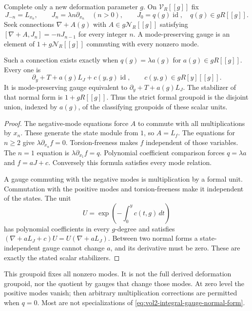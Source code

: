 Complete only a new deformation parameter $g$. On
$\mathcal V_R[[g]]$ fix
\[
 J_{-n}=L_{x_n},\qquad J_n=\lambda n\partial_{x_n}\quad(n>0),
 \qquad J_0=q(g)\operatorname{id},\quad q(g)\in gR[[g]].
\]
Seek connections $\nabla+A(g)$ with
$A\in g\mathcal N_R[[g]]$ satisfying
$[\nabla+A,J_n]=-nJ_{n-1}$ for every integer $n$.
A mode-preserving gauge is an element of
$1+g\mathcal N_R[[g]]$ commuting with every nonzero mode.

\begin{theorem}\label{thm:vol2-integral-gauge}
Such a connection exists exactly when $q(g)=\lambda a(g)$
for $a(g)\in gR[[g]]$. Every one is
\begin{equation}\label{eq:vol2-integral-gauge-normal-form}
 \partial_y+T+a(g)L_J+c(y,g)\operatorname{id},
                 \qquad c(y,g)\in gR[y][[g]].
\end{equation}
It is mode-preserving gauge equivalent to $\partial_y+T+a(g)L_J$.
The stabilizer of that normal form is $1+gR[[g]]$.
Thus the strict formal groupoid is the disjoint union, indexed
by $a(g)$, of the classifying groupoids of these scalar units.
\end{theorem}
\begin{proof}
The negative-mode equations force $A$ to commute with all
multiplications by $x_n$. These generate the state module
from $1$, so $A=L_f$. The equations for $n\geq2$ give
$\lambda\partial_{x_n}f=0$. Torsion-freeness makes $f$
independent of those variables. The $n=1$ equation is
$\lambda\partial_{x_1}f=q$. Polynomial coefficient comparison
forces $q=\lambda a$ and $f=aJ+c$. Conversely this formula
satisfies every mode relation.

A gauge commuting with the negative modes is multiplication
by a formal unit. Commutation with the positive modes and
torsion-freeness make it independent of the states. The unit
\[
 U=\exp\left(-\int_0^yc(t,g)\,dt\right)
\]
has polynomial coefficients in every $g$-degree and satisfies
$(\nabla+aL_J+c)U=U(\nabla+aL_J)$.
Between two normal forms a state-independent gauge cannot
change $a$, and its derivative must be zero. These are exactly
the stated scalar stabilizers.
\end{proof}

This groupoid fixes all nonzero modes. It is not the full
derived deformation groupoid, nor the quotient by gauges that
change those modes. At zero level the positive modes vanish;
then arbitrary multiplication corrections are permitted when
$q=0$. Most are not specializations of
\eqref{eq:vol2-integral-gauge-normal-form}.

